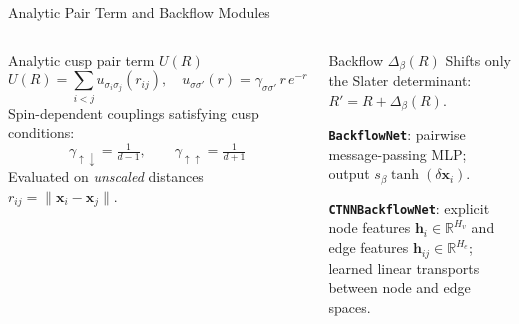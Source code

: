 \documentclass[aspectratio=169,10pt]{beamer}
\begin{document}
\begin{frame}{Analytic Pair Term and Backflow Modules}
  \begin{columns}[T]
      \begin{block}{Analytic cusp pair term $U(R)$}
        \[
          U(R)=\sum_{i<j} u_{\sigma_i\sigma_j}(r_{ij}),\quad
          u_{\sigma\sigma'}(r)=\gamma_{\sigma\sigma'}\,r\,e^{-r}
        \]
        Spin-dependent couplings satisfying cusp conditions:
        \[
          \gamma_{\uparrow\downarrow}=\tfrac{1}{d-1},\qquad
          \gamma_{\uparrow\uparrow}=\tfrac{1}{d+1}
        \]
        Evaluated on \emph{unscaled} distances $r_{ij}=\|\mathbf x_i-\mathbf x_j\|$.
      \end{block}
      \begin{block}{Backflow $\Delta_\beta(R)$}
        Shifts only the Slater determinant: $R'=R+\Delta_\beta(R)$.

        \smallskip
        \textbf{\texttt{BackflowNet}}: pairwise message-passing MLP;
        output $s_\beta\tanh(\delta\mathbf x_i)$.

        \smallskip
        \textbf{\texttt{CTNNBackflowNet}}: explicit node features $\mathbf h_i\in\mathbb R^{H_v}$ and
        edge features $\mathbf h_{ij}\in\mathbb R^{H_e}$; learned
        linear transports between node and edge spaces.
      \end{block}
  \end{columns}
\end{frame}
\end{document}
